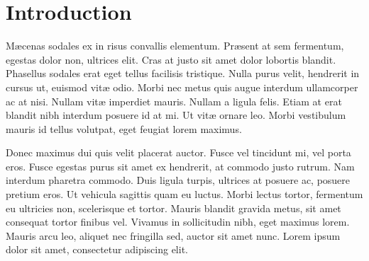 %
%

%
%
%
%
%
%
%
%


\section{Introduction} %

M\ae{}cenas sodales ex in risus convallis elementum. Pr\ae{}sent at sem fermentum, egestas dolor non, ultrices elit. Cras at justo sit amet dolor lobortis blandit. Phasellus sodales erat eget tellus facilisis tristique. Nulla purus velit, hendrerit in cursus ut, euismod vit\ae{} odio. Morbi nec metus quis augue interdum ullamcorper ac at nisi. Nullam vit\ae{} imperdiet mauris. Nullam a ligula felis. Etiam at erat blandit nibh interdum posuere id at mi. Ut vit\ae{} ornare leo. Morbi vestibulum mauris id tellus volutpat, eget feugiat lorem maximus.

Donec maximus dui quis velit placerat auctor. Fusce vel tincidunt mi, vel porta eros. Fusce egestas purus sit amet ex hendrerit, at commodo justo rutrum. Nam interdum pharetra commodo. Duis ligula turpis, ultrices at posuere ac, posuere pretium eros. Ut vehicula sagittis quam eu luctus. Morbi lectus tortor, fermentum eu ultricies non, scelerisque et tortor. Mauris blandit gravida metus, sit amet consequat tortor finibus vel. Vivamus in sollicitudin nibh, eget maximus lorem. Mauris arcu leo, aliquet nec fringilla sed, auctor sit amet nunc. Lorem ipsum dolor sit amet, consectetur adipiscing elit. 

